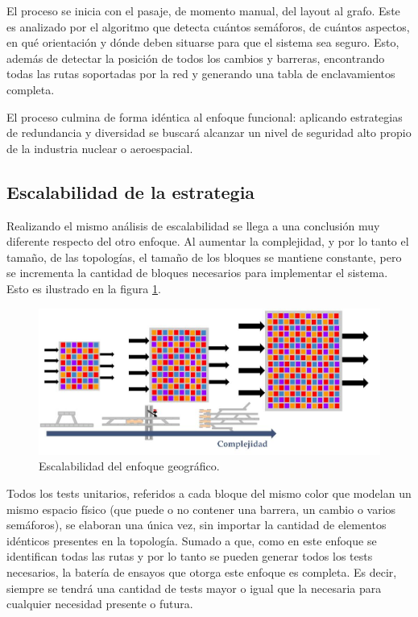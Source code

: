 		El proceso se inicia con el pasaje, de momento manual, del layout al grafo. Este es analizado por el algoritmo que detecta cuántos semáforos, de cuántos aspectos, en qué orientación y dónde deben situarse para que el sistema sea seguro. Esto, además de detectar la posición de todos los cambios y barreras, encontrando todas las rutas soportadas por la red y generando una tabla de enclavamientos completa.
		
		El proceso culmina de forma idéntica al enfoque funcional: aplicando estrategias de redundancia y diversidad se buscará alcanzar un nivel de seguridad alto propio de la industria nuclear o aeroespacial.
		
		\subsection{Escalabilidad de la estrategia}	
			
			Realizando el mismo análisis de escalabilidad se llega a una conclusión muy diferente respecto del otro enfoque. Al aumentar la complejidad, y por lo tanto el tamaño, de las topologías, el tamaño de los bloques se mantiene constante, pero se incrementa la cantidad de bloques necesarios para implementar el sistema. Esto es ilustrado en la figura \ref{fig:Escala_Geografico}.
					
			\begin{figure}[h]
			\centering
				\includegraphics[scale=.4]{./Figures/Geografico_complejidad}
				\caption{Escalabilidad del enfoque geográfico.}
				\label{fig:Escala_Geografico}
			\end{figure}
		
			
			Todos los tests unitarios, referidos a cada bloque del mismo color que modelan un mismo espacio físico (que puede o no contener una barrera, un cambio o varios semáforos), se elaboran una única vez, sin importar la cantidad de elementos idénticos presentes en la topología. Sumado a que, como en este enfoque se identifican todas las rutas y por lo tanto se pueden generar todos los tests necesarios, la batería de ensayos que otorga este enfoque es completa. Es decir, siempre se tendrá una cantidad de tests mayor o igual que la necesaria para cualquier necesidad presente o futura.
		

